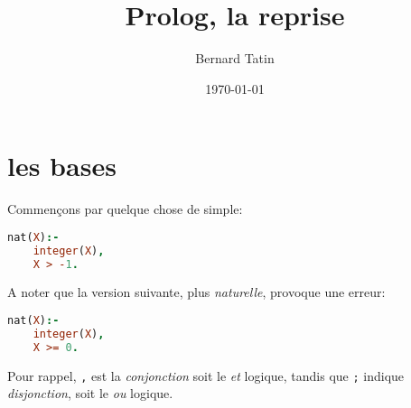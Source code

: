 \documentclass[a4paper,11pt,twocolumn]{book}
\title{Prolog, la reprise}
\author{Bernard Tatin}
\date{\today}
\begin{document}
\maketitle
\tableofcontents

\chapter{les bases}
Commençons par quelque chose de simple:

\begin{lstlisting}[language=Prolog]
nat(X):-
	integer(X),
	X > -1.
\end{lstlisting}

A noter que la version suivante, plus \emph{naturelle}, provoque une erreur:

\begin{lstlisting}[language=Prolog]
nat(X):-
	integer(X),
	X >= 0.
\end{lstlisting}

Pour rappel, \texttt{,} est la \textit{conjonction} soit le \textit{et} logique, tandis que \texttt{;} indique \textit{disjonction}, soit le \textit{ou} logique.
\end{document}
